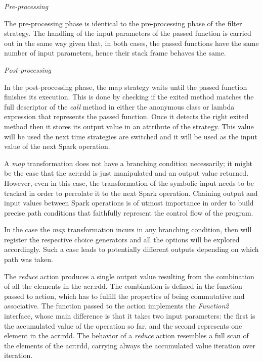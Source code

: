 \textit{Pre-processing}

The pre-processing phase is identical to the pre-processing phase of the filter strategy. The handling of the input parameters of the passed function is carried out in the same way given that, in both cases, the passed functions have the same number of input parameters, hence their stack frame behaves the same.

\textit{Post-processing}

In the post-processing phase, the map strategy waits until the passed function finishes its execution. This is done by checking if the exited method matches the full descriptor of the \textit{call} method in either the anonymous class or lambda expression that represents the passed function. Once it detects the right exited method then it stores its output value in an attribute of the strategy. This value will be used the next time strategies are switched and it will be used as the input value of the next Spark operation.

A \textit{map} transformation does not have a branching condition necessarily; it might be the case that the \acrshort{acr:rdd} is just manipulated and an output value returned. However, even in this case, the transformation of the symbolic input needs to be tracked in order to percolate it to the next Spark operation. Chaining output and input values between Spark operations is of utmost importance in order to build precise path conditions that faithfully represent the control flow of the program.

In the case the \textit{map} transformation incurs in any branching condition, then \spf{} will register the respective choice generators and all the options will be explored accordingly. Such a case leads to potentially different outputs depending on which path was taken.



The \textit{reduce} action produces a single output value resulting from the combination of all the elements in the \acrshort{acr:rdd}. The combination is defined in the function passed to action, which has to fulfill the properties of being commutative and associative. The function passed to the action implements the \textit{Function2} interface, whose main difference is that it takes two input parameters: the first is the accumulated value of the operation so far, and the second represents one element in the \acrshort{acr:rdd}. The behavior of a \textit{reduce} action resembles a full scan of the elements of the \acrshort{acr:rdd}, carrying always the accumulated value iteration over iteration.

